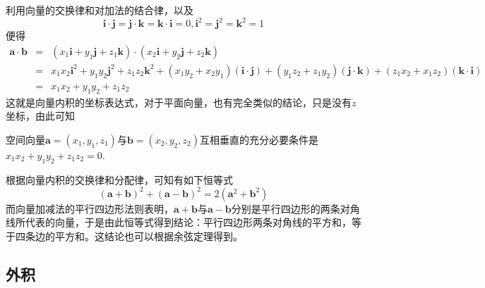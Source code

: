 利用向量的交换律和对加法的结合律，以及
\[ \bm{i} \cdot \bm{j} = \bm{j} \cdot \bm{k} = \bm{k} \cdot \bm{i} = 0, \bm{i}^2 = \bm{j}^2 = \bm{k}^2=1 \]
便得
\begin{eqnarray*}
  \bm{a} \cdot \bm{b} & = & (x_1 \bm{i} + y_1 \bm{j} + z_1 \bm{k}) \cdot (x_2 \bm{i} + y_2 \bm{j} + z_2 \bm{k}) \\
                      & = & x_1x_2 \bm{i}^2 + y_1y_2 \bm{j}^2 + z_1z_2 \bm{k}^2 + (x_1y_2+x_2y_1)(\bm{i} \cdot \bm{j}) + (y_1z_2+z_1y_2)(\bm{j} \cdot \bm{k}) + (z_1x_2 + x_1z_2)(\bm{k} \cdot \bm{i}) \\
  & = & x_1x_2 + y_1y_2+z_1z_2
\end{eqnarray*}
这就是向量内积的坐标表达式，对于平面向量，也有完全类似的结论，只是没有$z$坐标，由此可知

\begin{theorem}
  空间向量$\bm{a}=(x_1,y_1,z_1)$与$\bm{b} = (x_2,y_2,z_2)$互相垂直的充分必要条件是$x_1x_2+y_1y_2+z_1z_2=0$.
\end{theorem}

\begin{example}
  根据向量内积的交换律和分配律，可知有如下恒等式
  \[ (\bm{a}+\bm{b})^2 + (\bm{a}-\bm{b})^2 = 2(\bm{a}^2+\bm{b}^2) \]
而向量加减法的平行四边形法则表明，$\bm{a+b}$与$\bm{a-b}$分别是平行四边形的两条对角线所代表的向量，于是由此恒等式得到结论：平行四边形两条对角线的平方和，等于四条边的平方和。这结论也可以根据余弦定理得到。
\end{example}


\subsection{外积}
\label{sec:outer-product-of-vectors}



